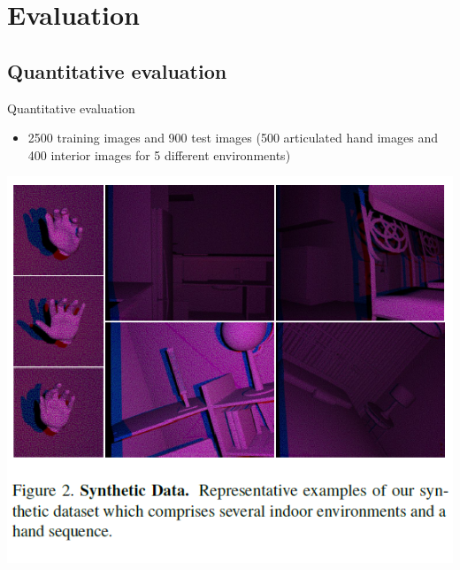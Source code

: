 \section{Evaluation}%
\subsection{Quantitative evaluation}
\begin{frame}{Quantitative evaluation}
\begin{itemize}
\item 2500 training images and 900 test images (500 articulated hand images and 400 interior images for 5 different environments)
\end{itemize}
\centering
\includegraphics[scale=0.7]{pictures/fig2_synthetic_data}
\end{frame}

